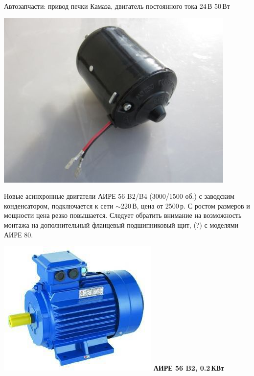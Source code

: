 \documentclass{magazine}
\begin{document}
\begin{multicols}{2}
\bigskip
Автозапчасти: привод печки Камаза, двигатель постоянного тока 24\,В
  50\,Вт
  
\noindent\includegraphics[width=\columnwidth]{fig/00/KamazDvig.jpg}
  
\bigskip
Новые асинхронные двигатели АИРЕ 56 B2/B4 (3000/1500 об.)
с заводским конденсатором, подключается к сети $\sim$220\,В, цена от 2500\,р.
С ростом размеров и мощности цена резко повышается.
Следует обратить внимание на возможность монтажа на дополнительный фланцевый
подшипниковый щит, (?) с моделями АИРЕ 80.

\noindent\includegraphics[width=\columnwidth]{fig/00/AIRE.jpg}
\textbf{АИРЕ 56 B2, 0.2\,КВт}


\end{multicols}
\end{document}
